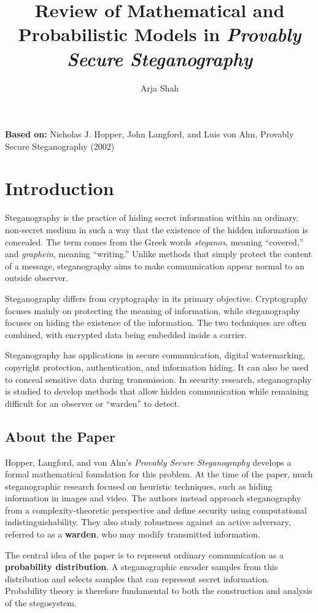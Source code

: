\documentclass[14pt]{article}
\title{Review of Mathematical and Probabilistic Models in \textit{Provably Secure Steganography}}
\author{Arja Shah}
\date{}
\begin{document}
\maketitle
\textbf{Based on:} Nicholas J. Hopper, John Langford, and Luis von Ahn, Provably Secure Steganography (2002)

\section{Introduction}

Steganography is the practice of hiding secret information within an ordinary, non-secret medium in such a way that the existence of the hidden information is concealed. The term comes from the Greek words \textit{steganos}, meaning “covered,” and \textit{graphein}, meaning “writing.” Unlike methods that simply protect the content of a message, steganography aims to make communication appear normal to an outside observer.

Steganography differs from cryptography in its primary objective. Cryptography focuses mainly on protecting the meaning of information, while steganography focuses on hiding the existence of the information. The two techniques are often combined, with encrypted data being embedded inside a carrier.

Steganography has applications in secure communication, digital watermarking, copyright protection, authentication, and information hiding. It can also be used to conceal sensitive data during transmission. In security research, steganography is studied to develop methods that allow hidden communication while remaining difficult for an observer or “warden” to detect.


\subsection{About the Paper}
Hopper, Langford, and von Ahn's \textit{Provably Secure Steganography} develops a formal mathematical foundation for this problem. At the time of the paper, much steganographic research focused on heuristic techniques, such as hiding information in images and video. The authors instead approach steganography from a complexity-theoretic perspective and define security using computational indistinguishability. They also study robustness against an active adversary, referred to as a \textbf{warden}, who may modify transmitted information.

The central idea of the paper is to represent ordinary communication as a \textbf{probability distribution}. A steganographic encoder samples from this distribution and selects samples that can represent secret information. Probability theory is therefore fundamental to both the construction and analysis of the stegosystem.
\end{document}
